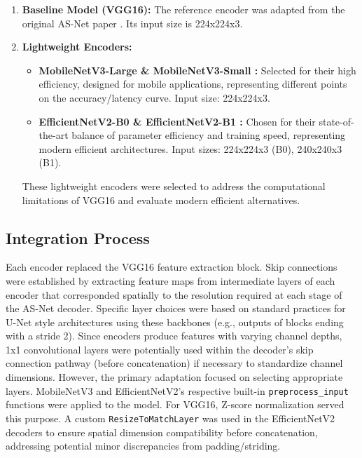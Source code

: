 \begin{enumerate}
  \item \textbf{Baseline Model (VGG16):} The reference encoder was adapted from the original AS-Net paper \parencite{hu2022asnet}. Its input size is 224x224x3.
  \item \textbf{Lightweight Encoders:}
    \begin{itemize}
      \item \textbf{MobileNetV3-Large \& MobileNetV3-Small \parencite{howard2019searching}:} Selected for their high efficiency, designed for mobile applications, representing different points on the accuracy/latency curve. Input size: 224x224x3.
      \item \textbf{EfficientNetV2-B0 \& EfficientNetV2-B1 \parencite{tan2021efficientnetv2}:} Chosen for their state-of-the-art balance of parameter efficiency and training speed, representing modern efficient architectures. Input sizes: 224x224x3 (B0), 240x240x3 (B1).
    \end{itemize}
    These lightweight encoders were selected to address the computational limitations of VGG16 and evaluate modern efficient alternatives.
\end{enumerate}

\subsection{Integration Process}
Each encoder replaced the VGG16 feature extraction block. Skip connections were established by extracting feature maps from intermediate layers of each encoder that corresponded spatially to the resolution required at each stage of the AS-Net decoder. Specific layer choices were based on standard practices for U-Net style architectures using these backbones (e.g., outputs of blocks ending with a stride 2). Since encoders produce features with varying channel depths, 1x1 convolutional layers were potentially used within the decoder's skip connection pathway (before concatenation) if necessary to standardize channel dimensions. However, the primary adaptation focused on selecting appropriate layers. MobileNetV3 and EfficientNetV2's respective built-in \texttt{preprocess\_input} functions were applied to the model. For VGG16, Z-score normalization served this purpose. A custom \texttt{ResizeToMatchLayer} was used in the EfficientNetV2 decoders to ensure spatial dimension compatibility before concatenation, addressing potential minor discrepancies from padding/striding.

